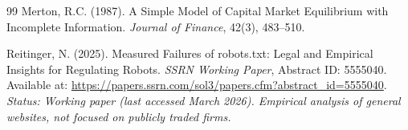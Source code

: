 \documentclass[12pt,a4paper]{article}
\begin{document}
\begin{thebibliography}{99}
Merton, R.C. (1987).
\newblock A Simple Model of Capital Market Equilibrium with Incomplete Information.
\newblock \emph{Journal of Finance}, 42(3), 483--510.

Reitinger, N. (2025).
\newblock Measured Failures of robots.txt: Legal and Empirical Insights for Regulating Robots.
\newblock \emph{SSRN Working Paper}, Abstract ID: 5555040.
\newblock Available at: \url{https://papers.ssrn.com/sol3/papers.cfm?abstract_id=5555040}.
\newblock \textit{Status: Working paper (last accessed March 2026). Empirical analysis of general websites, not focused on publicly traded firms.}

\end{thebibliography}
\end{document}
